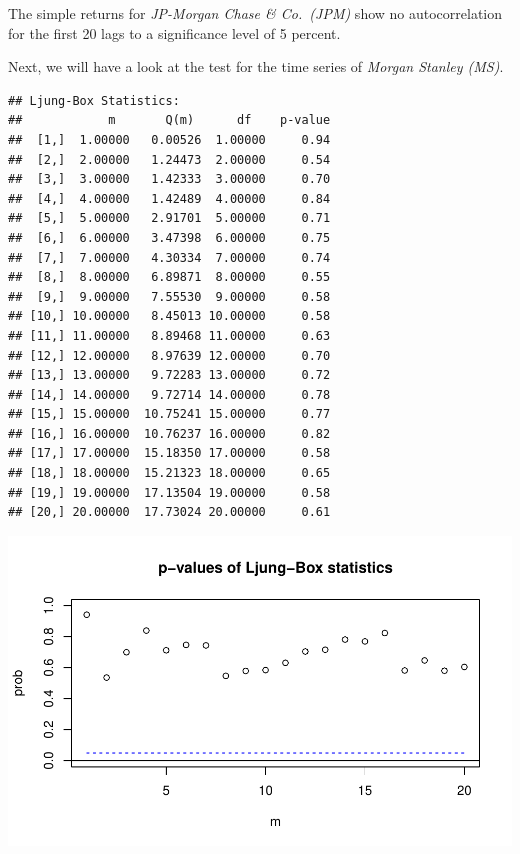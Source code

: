 \documentclass[12pt,a4paper]{article}
\newenvironment{Shaded}{\begin{snugshade}}{\end{snugshade}}
\newcommand{\DataTypeTok}[1]{\textcolor[rgb]{0.13,0.29,0.53}{#1}}
\newcommand{\DecValTok}[1]{\textcolor[rgb]{0.00,0.00,0.81}{#1}}
\newcommand{\KeywordTok}[1]{\textcolor[rgb]{0.13,0.29,0.53}{\textbf{#1}}}
\newcommand{\NormalTok}[1]{#1}
\newcommand{\OperatorTok}[1]{\textcolor[rgb]{0.81,0.36,0.00}{\textbf{#1}}}
\begin{document}
\FloatBarrier

The simple returns for \emph{JP-Morgan Chase \& Co.~(JPM)} show no
autocorrelation for the first 20 lags to a significance level of 5
percent.

Next, we will have a look at the test for the time series of
\emph{Morgan Stanley (MS)}. \FloatBarrier

\begin{Shaded}
\end{Shaded}

\begin{verbatim}
## Ljung-Box Statistics:  
##            m       Q(m)      df    p-value
##  [1,]  1.00000   0.00526  1.00000     0.94
##  [2,]  2.00000   1.24473  2.00000     0.54
##  [3,]  3.00000   1.42333  3.00000     0.70
##  [4,]  4.00000   1.42489  4.00000     0.84
##  [5,]  5.00000   2.91701  5.00000     0.71
##  [6,]  6.00000   3.47398  6.00000     0.75
##  [7,]  7.00000   4.30334  7.00000     0.74
##  [8,]  8.00000   6.89871  8.00000     0.55
##  [9,]  9.00000   7.55530  9.00000     0.58
## [10,] 10.00000   8.45013 10.00000     0.58
## [11,] 11.00000   8.89468 11.00000     0.63
## [12,] 12.00000   8.97639 12.00000     0.70
## [13,] 13.00000   9.72283 13.00000     0.72
## [14,] 14.00000   9.72714 14.00000     0.78
## [15,] 15.00000  10.75241 15.00000     0.77
## [16,] 16.00000  10.76237 16.00000     0.82
## [17,] 17.00000  15.18350 17.00000     0.58
## [18,] 18.00000  15.21323 18.00000     0.65
## [19,] 19.00000  17.13504 19.00000     0.58
## [20,] 20.00000  17.73024 20.00000     0.61
\end{verbatim}

\includegraphics{exercise_1_files/figure-latex/unnamed-chunk-4-1.pdf}
\end{document}
